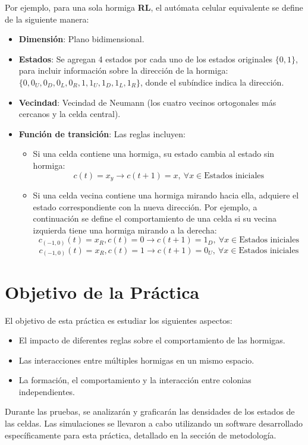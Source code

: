 \documentclass[12pt,twoside]{article}
\begin{document}
	Por ejemplo, para una sola hormiga \textbf{RL}, el autómata celular equivalente se define de la siguiente manera: 
	\begin{itemize}
		\item \textbf{Dimensión}: Plano bidimensional.  
		\item \textbf{Estados}: Se agregan 4 estados por cada uno de los estados originales $\{0, 1\}$, para incluir información sobre la dirección de la hormiga: $\{0, 0_U, 0_D, 0_L, 0_R, 1, 1_U, 1_D, 1_L, 1_R\}$, donde el subíndice indica la dirección.  
		\item \textbf{Vecindad}: Vecindad de Neumann (los cuatro vecinos ortogonales más cercanos y la celda central).  
		\item \textbf{Función de transición}: Las reglas incluyen:  
		\begin{itemize}
			\item Si una celda contiene una hormiga, su estado cambia al estado sin hormiga:  
			\[ c(t) = x_y \rightarrow c(t+1) = x, \: \forall x \in \text{Estados iniciales} \]  
			\item Si una celda vecina contiene una hormiga mirando hacia ella, adquiere el estado correspondiente con la nueva dirección. Por ejemplo, a continuación se define el comportamiento de una celda si su vecina izquierda tiene una hormiga mirando a la derecha:  
			\[
			c_{(-1, 0)}(t) = x_R, c(t) = 0 \rightarrow c(t+1) = 1_D, \: \forall x \in \text{Estados iniciales}
			\]
			\[
			c_{(-1, 0)}(t) = x_R, c(t) = 1 \rightarrow c(t+1) = 0_U, \: \forall x \in \text{Estados iniciales}
			\]
		\end{itemize}
	\end{itemize}
	
\section{Objetivo de la Práctica}

El objetivo de esta práctica es estudiar los siguientes aspectos:  
\begin{itemize}
	\item El impacto de diferentes reglas sobre el comportamiento de las hormigas.  
	\item Las interacciones entre múltiples hormigas en un mismo espacio.  
	\item La formación, el comportamiento y la interacción entre colonias independientes.  
\end{itemize}

Durante las pruebas, se analizarán y graficarán las densidades de los estados de las celdas. Las simulaciones se llevaron a cabo utilizando un software desarrollado específicamente para esta práctica, detallado en la sección de metodología.
\end{document}
